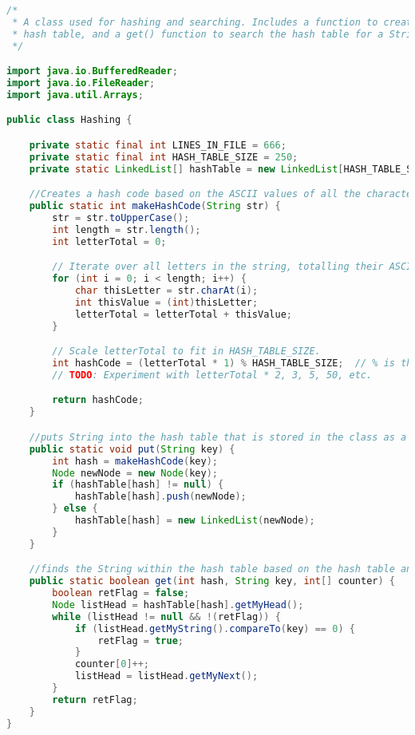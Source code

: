 \documentclass[letterpaper, 10pt,DIV=13]{scrartcl}
\numberwithin{equation}{section} %
\numberwithin{figure}{section} %
\numberwithin{table}{section} %
\begin{document}
\begin{lstlisting}[frame=single, language=java, breaklines]  
/*
 * A class used for hashing and searching. Includes a function to create a hash code, and then a put() function to put the String in the
 * hash table, and a get() function to search the hash table for a String
 */

import java.io.BufferedReader;
import java.io.FileReader;
import java.util.Arrays;

public class Hashing {

    private static final int LINES_IN_FILE = 666;
    private static final int HASH_TABLE_SIZE = 250;
    private static LinkedList[] hashTable = new LinkedList[HASH_TABLE_SIZE];

    //Creates a hash code based on the ASCII values of all the characters in the String
    public static int makeHashCode(String str) {
        str = str.toUpperCase();
        int length = str.length();
        int letterTotal = 0;

        // Iterate over all letters in the string, totalling their ASCII values.
        for (int i = 0; i < length; i++) {
            char thisLetter = str.charAt(i);
            int thisValue = (int)thisLetter;
            letterTotal = letterTotal + thisValue;
        }

        // Scale letterTotal to fit in HASH_TABLE_SIZE.
        int hashCode = (letterTotal * 1) % HASH_TABLE_SIZE;  // % is the "mod" operator
        // TODO: Experiment with letterTotal * 2, 3, 5, 50, etc.

        return hashCode;
    }

    //puts String into the hash table that is stored in the class as a static variable. Uses makeHashCode() to create the hash.
    public static void put(String key) {
        int hash = makeHashCode(key);
        Node newNode = new Node(key);
        if (hashTable[hash] != null) {
            hashTable[hash].push(newNode);
        } else {
            hashTable[hash] = new LinkedList(newNode);
        }
    }

    //finds the String within the hash table based on the hash table and the String itself as a key.
    public static boolean get(int hash, String key, int[] counter) {
        boolean retFlag = false;
        Node listHead = hashTable[hash].getMyHead();
        while (listHead != null && !(retFlag)) {
            if (listHead.getMyString().compareTo(key) == 0) {
                retFlag = true;
            }
            counter[0]++;
            listHead = listHead.getMyNext();
        }
        return retFlag;
    }
}
\end{lstlisting}
\end{document}
